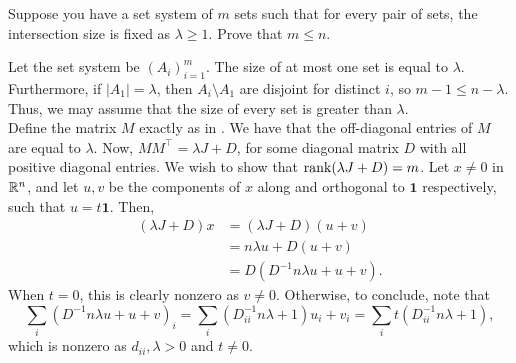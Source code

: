 \documentclass{article}
\begin{document}
\begin{exercise}
	Suppose you have a set system of $m$ sets such that for every pair of sets, the intersection size is fixed as $\lambda \ge 1$. Prove that $m \le n$.
\end{exercise}
\begin{solution*}
	Let the set system be $(A_{i})_{i=1}^m$. The size of at most one set is equal to $\lambda$. Furthermore, if $|A_1| = \lambda$, then $A_i \setminus A_1$ are disjoint for distinct $i$, so $m-1 \le n-\lambda$. Thus, we may assume that the size of every set is greater than $\lambda$.\\
	Define the matrix $M$ exactly as in . We have that the off-diagonal entries of $M$ are equal to $\lambda$. Now, $MM^\top = \lambda J + D$, for some diagonal matrix $D$ with all positive diagonal entries. We wish to show that $\operatorname{rank}(\lambda J + D) = m$. Let $x \ne 0$ in $\mathbb{R}^n$, and let $u,v$ be the components of $x$ along and orthogonal to $\mathbf{1}$ respectively, such that $u = t\mathbf{1}$. Then,
	\begin{align*}
		(\lambda J + D)x &= (\lambda J + D)(u+v) \\
			&= n\lambda u + D(u+v) \\
			&= D (D^{-1}n\lambda u + u+v).
	\end{align*}
	When $t = 0$, this is clearly nonzero as $v \ne 0$. Otherwise, to conclude, note that
	\[ \sum_i (D^{-1}n\lambda u + u + v)_i = \sum_i (D_{ii}^{-1} n \lambda + 1) u_i + v_i = \sum_i t(D_{ii}^{-1}n\lambda + 1),  \]
	which is nonzero as $d_{ii},\lambda > 0$ and $t \ne 0$.
\end{solution*}
\end{document}
